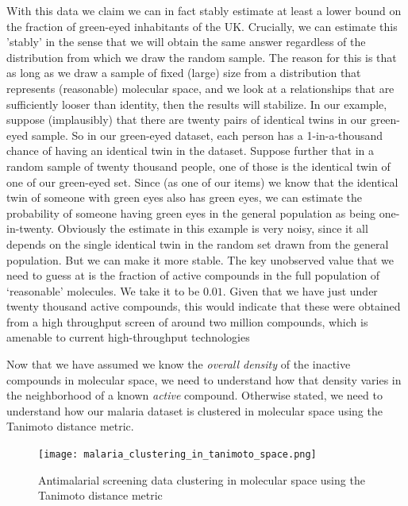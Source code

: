 \documentclass{article}
\begin{document}
With this data we claim we can in fact stably estimate at least a lower bound on the fraction of green-eyed inhabitants of the UK.  Crucially, we can estimate this 'stably' in the sense that we will obtain the same answer regardless of the distribution from which we draw the random sample.  The reason for this is that as long as we draw a sample of fixed (large) size from a distribution that represents (reasonable) molecular space, and we look at a relationships that are sufficiently looser than identity, then the results will stabilize.  
\newline
\newline
In our example, suppose (implausibly) that there are twenty pairs of identical twins in our green-eyed sample. So in our green-eyed dataset, each person has a 1-in-a-thousand chance of having an identical twin in the dataset.  Suppose further that in a random sample of twenty thousand people, one of those is the identical twin of one of our green-eyed set.  Since (as one of our items) we know that the identical twin of someone with green eyes also has green eyes, we can estimate the probability of someone having green eyes in the general population as being one-in-twenty.
\newline
\newline
Obviously the estimate in this example is very noisy, since it all depends on the single identical twin in the random set drawn from the general population.  But we can make it more stable. The key unobserved value that we need to guess at is the fraction of active compounds in the full population of `reasonable' molecules.  We take it to be $0.01$.  Given that we have just under twenty thousand active compounds, this would indicate that these were obtained from a high throughput screen of around two million compounds, 
which is amenable to current high-throughput technologies\cite{PaweSzymanskiMagdalenaMarkowicz2012}

Now that we have assumed we know the \textit{overall density} of the inactive compounds in molecular space, we need to understand how that density varies in the neighborhood of a known \textit{active} compound.  Otherwise stated, we need to understand how our malaria dataset is clustered in molecular space using the Tanimoto distance metric.

\begin{figure}
    \centering
    \texttt{[image: malaria\_clustering\_in\_tanimoto\_space.png]}
    \caption{Antimalarial screening data clustering in molecular space using the Tanimoto distance metric}
    \label{fig:mal_cluster}
\end{figure}
\end{document}
